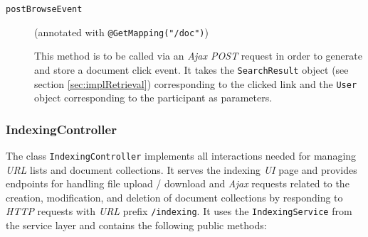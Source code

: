 \documentclass[a4paper]{usiinfbachelorproject}
\begin{document}
\begin{description}
        \item[\texttt{postBrowseEvent}]
        (annotated with \texttt{@GetMapping("/doc")})

        This method is to be called via an \emph{Ajax POST} request in order to generate and store a document
        click event. It takes the \texttt{SearchResult} object (see section \ref{sec:implRetrieval}) corresponding to the clicked link 
        and the \texttt{User} object corresponding to the participant as parameters.

    \end{description}

\subsubsection{\textbf{IndexingController}}

The class \texttt{IndexingController} implements all interactions needed for managing \emph{URL} lists
and document collections. It serves the indexing \emph{UI} page and provides endpoints for handling file upload / download
and \emph{Ajax} requests related to the creation, modification, and deletion of document collections by responding
to \emph{HTTP} requests with \emph{URL} prefix \texttt{/indexing}.
It uses the \texttt{IndexingService} from the service layer and contains the following public methods:
\end{document}

